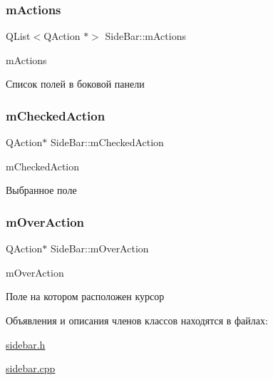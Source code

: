 \subsubsection{\texorpdfstring{m\+Actions}{mActions}}
{\footnotesize\ttfamily Q\+List$<$Q\+Action $\ast$$>$ Side\+Bar\+::m\+Actions\hspace{0.3cm}{\ttfamily [private]}}



m\+Actions 

Список полей в боковой панели \mbox{\label{classSideBar_a2db27c5981c8f43be372af9bbbe8fa41}} 
\subsubsection{\texorpdfstring{m\+Checked\+Action}{mCheckedAction}}
{\footnotesize\ttfamily Q\+Action$\ast$ Side\+Bar\+::m\+Checked\+Action\hspace{0.3cm}{\ttfamily [private]}}



m\+Checked\+Action 

Выбранное поле \mbox{\label{classSideBar_a51fcdf6ce60fba976982b2ef06bec853}} 
\subsubsection{\texorpdfstring{m\+Over\+Action}{mOverAction}}
{\footnotesize\ttfamily Q\+Action$\ast$ Side\+Bar\+::m\+Over\+Action\hspace{0.3cm}{\ttfamily [private]}}



m\+Over\+Action 

Поле на котором расположен курсор 

Объявления и описания членов классов находятся в файлах\+:\begin{DoxyCompactItemize}
\item 
\hyperlink{sidebar_8h}{sidebar.\+h}\item 
\hyperlink{sidebar_8cpp}{sidebar.\+cpp}\end{DoxyCompactItemize}

